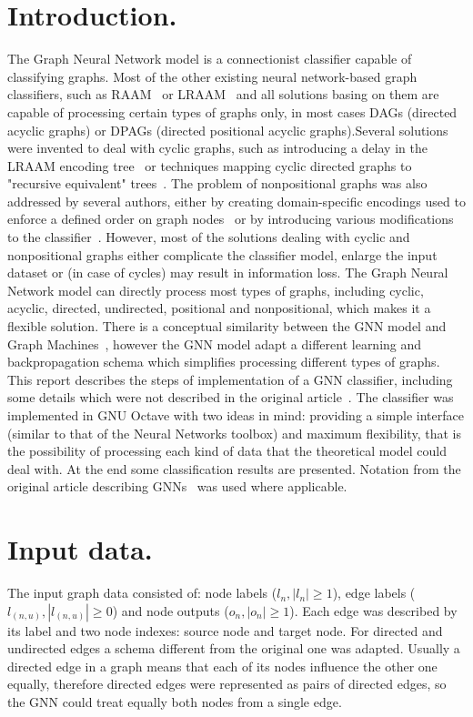\documentclass[a4paper, 11pt, twocolumn]{spie}  %
\begin{document}
\section{Introduction.}
The Graph Neural Network model is a connectionist classifier capable of classifying graphs. Most of the other existing neural network-based graph classifiers, such as RAAM~ or  LRAAM~ and all solutions basing on them are capable of processing certain types of graphs only, in most cases DAGs (directed acyclic graphs) or DPAGs (directed positional acyclic graphs).Several solutions were invented to deal with cyclic graphs, such as introducing a delay in the LRAAM encoding tree~ or techniques mapping cyclic directed graphs to "recursive equivalent" trees~. The problem of nonpositional graphs was also addressed by several authors, either by creating domain-specific encodings used to enforce a defined order on graph nodes~ or by introducing various modifications to the classifier~. However, most of the solutions dealing with cyclic and nonpositional graphs either complicate the classifier model, enlarge the input dataset or (in case of cycles) may result in information loss. The Graph Neural Network model can directly process most types of graphs, including cyclic, acyclic, directed, undirected, positional and nonpositional, which makes it a flexible solution. There is a conceptual similarity between the GNN model and Graph Machines~, however the GNN model adapt a different learning and backpropagation schema which simplifies processing different types of graphs. This report describes the steps of implementation of a GNN classifier, including some details which were not described in the original article~. The classifier was implemented in GNU Octave with two ideas in mind: providing a simple interface (similar to that of the Neural Networks toolbox) and maximum flexibility, that is the possibility of processing each kind of data that the theoretical model could deal with. At the end some classification results are presented. Notation from the original article describing GNNs~ was used where applicable.

\section{Input data.}
The input graph data consisted of: node labels ($l_n, |l_n| \geq 1$), edge labels ($l_{(n,u)}, |l_{(n,u)}| \geq 0$) and node outputs ($o_n, |o_n| \geq 1$). Each edge was described by its label and two node indexes: source node and target node. For directed and undirected edges a schema different from the original one was adapted. Usually a directed edge in a graph means that each of its nodes influence the other one equally, therefore directed edges were represented as pairs of directed edges, so the GNN could treat equally both nodes from a single edge.
\end{document}
